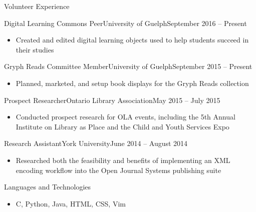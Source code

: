 \documentclass[]{mcdowellcv}
\begin{document}
	\begin{cvsection}{Volunteer Experience}
        \begin{cvsubsection}{Digital Learning Commons Peer}{University of Guelph}{September 2016 -- Present}
			\begin{itemize}
				\item Created and edited digital learning objects used to help students succeed in their studies
			\end{itemize}
		\end{cvsubsection}
        \begin{cvsubsection}{Gryph Reads Committee Member}{University of Guelph}{September 2015 -- Present}
			\begin{itemize}
				\item Planned, marketed, and setup book displays for the Gryph Reads collection
			\end{itemize}
		\end{cvsubsection}
        \begin{cvsubsection}{Prospect Researcher}{Ontario Library Association}{May 2015 -- July 2015}
			\begin{itemize}
				\item Conducted prospect research for OLA events, including the 5th Annual Institute on Library as Place and the Child and Youth Services Expo
			\end{itemize}
		\end{cvsubsection}
        \begin{cvsubsection}{Research Assistant}{York University}{June 2014 -- August 2014}
			\begin{itemize}
				\item Researched both the feasibility and benefits of implementing an XML encoding workflow into the Open Journal Systems publishing suite
			\end{itemize}
		\end{cvsubsection}
	\end{cvsection}
	
	\begin{cvsection}{Languages and Technologies}
		\begin{cvsubsection}{}{}{}	
			\begin{itemize}
				\item C, Python, Java, HTML, CSS, Vim
			\end{itemize}
		\end{cvsubsection}
	\end{cvsection}
	
\end{document}
